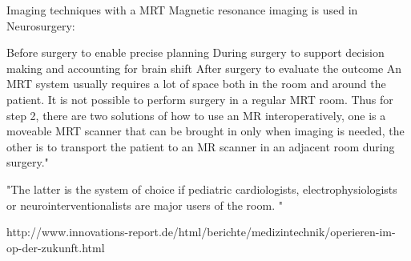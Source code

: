 	Imaging techniques with a MRT
	Magnetic resonance imaging is used in Neurosurgery:
	
	Before surgery to enable precise planning
	During surgery to support decision making and accounting for brain shift
	After surgery to evaluate the outcome
	An MRT system usually requires a lot of space both in the room and around the patient. It is not possible to perform surgery in a regular MRT room. Thus for step 2, there are two solutions of how to use an MR interoperatively, one is a moveable MRT scanner that can be brought in only when imaging is needed, the other is to transport the patient to an MR scanner in an adjacent room during surgery."
	
	"The latter is the system of choice if pediatric cardiologists, electrophysiologists or neurointerventionalists are major users of the room. "
	
http://www.innovations-report.de/html/berichte/medizintechnik/operieren-im-op-der-zukunft.html

